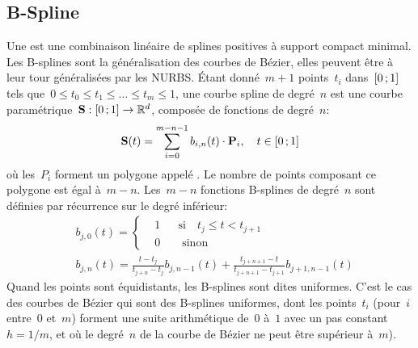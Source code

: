 \subsection{B-Spline}
Une  est une combinaison linéaire de splines positives à support compact minimal. Les B-splines sont la généralisation des courbes de Bézier, elles peuvent être à leur tour généralisées par les NURBS. Étant donné~$m+1$ points~$t_i$ dans~$\mathopen{[}0\,;1\mathclose{]}$ tels que~$0\le t_0\le t_1\le\ldots\le t_m\le 1$, une courbe spline de degré~$n$ est une courbe paramétrique~$\mathbf{S}:\mathopen{[}0\,;1\mathclose{]}\to\mathbb{R}^d$, composée de fonctions  de degré~$n$: 
\begin{equation}
\mathbf{S}(t)=\sum_{i=0}^{m-n-1}b_{i,n}(t)\cdot\mathbf{P}_{i},\quad t \in \mathopen{[}0\,;1\mathclose{]}
\end{equation}
où les~$P_i$ forment un polygone appelé . Le nombre de points composant ce polygone est égal à~$m-n$. Les~$m-n$ fonctions B-splines de degré~$n$ sont définies par récurrence sur le degré inférieur: 
\begin{align}
&b_{j, 0}(t)= \left\{ 
\begin{aligned} &1 && \text{si} \quad t_j \leqslant t < t_{j + 1} \\
&0 && \text{ sinon} 
\end{aligned} \right.\\
&b_{j, n}(t)= \frac{t - t_j}{t_{j + n} - t_j} b_{j, n - 1}(t) + \frac{t_{j + n + 1} - t}{t_{j + n + 1} - t_{j + 1}} b_{j + 1, n - 1}(t)
\end{align}
Quand les points sont équidistants, les B-splines sont dites uniformes. C'est le cas des courbes de Bézier qui sont des B-splines uniformes, dont les points~$t_i$ (pour~$i$ entre~$0$ et~$m$) forment une suite arithmétique de~$0$ à~$1$ avec un pas constant~$h=1/m$, et où le degré~$n$ de la courbe de Bézier ne peut être supérieur à~$m$). 

 
 
